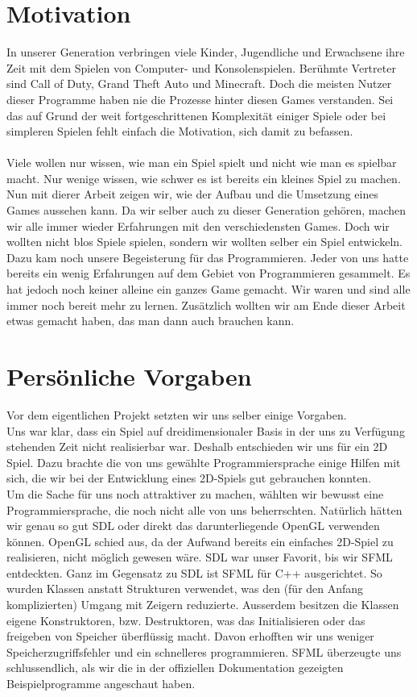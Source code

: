 \documentclass[11pt,a4paper]{scrbook}
\begin{document}
\section{Motivation}
In unserer Generation verbringen viele Kinder, Jugendliche und Erwachsene
ihre Zeit mit dem Spielen von Computer- und Konsolenspielen.
Berühmte Vertreter sind Call of Duty, Grand Theft Auto und Minecraft.
Doch die meisten Nutzer dieser Programme haben nie die Prozesse hinter diesen Games verstanden.
Sei das auf Grund der weit fortgeschrittenen Komplexität einiger Spiele
oder bei simpleren Spielen fehlt einfach die Motivation, sich damit zu befassen.\\
\\
Viele wollen nur wissen, wie man ein Spiel spielt und nicht wie man es spielbar macht. Nur wenige wissen, wie schwer es ist bereits ein
kleines Spiel zu machen. Nun mit dierer Arbeit zeigen wir, wie der Aufbau und die Umsetzung eines Games aussehen kann.
Da wir selber auch zu dieser Generation gehören, 
machen wir alle immer wieder Erfahrungen mit den verschiedensten Games.
Doch wir wollten nicht blos Spiele spielen, 
sondern wir wollten selber ein Spiel entwickeln.
Dazu kam noch unsere Begeisterung für das Programmieren.
Jeder von uns hatte bereits ein wenig Erfahrungen auf dem Gebiet von Programmieren gesammelt. Es hat jedoch noch keiner alleine
ein ganzes Game gemacht. Wir waren und sind alle immer noch bereit mehr zu lernen.
Zusätzlich wollten wir am Ende dieser Arbeit etwas gemacht haben, das man dann auch brauchen kann.

\section{Persönliche Vorgaben}

Vor dem eigentlichen Projekt setzten wir uns selber einige Vorgaben.
\\
Uns war klar, dass ein Spiel auf dreidimensionaler Basis in der uns zu Verfügung stehenden Zeit nicht realisierbar war. Deshalb entschieden wir uns für ein 2D Spiel.
Dazu brachte die von uns gewählte Programmiersprache einige Hilfen mit sich, die wir bei der Entwicklung eines 2D-Spiels gut gebrauchen konnten.
\\
Um die Sache für uns noch attraktiver zu machen,
wählten wir bewusst eine Programmiersprache, die noch nicht
alle von uns beherrschten. Natürlich hätten wir genau so gut
SDL oder direkt das darunterliegende OpenGL verwenden können. OpenGL
schied aus, da der Aufwand bereits ein einfaches 2D-Spiel zu realisieren, nicht möglich gewesen wäre. SDL war unser Favorit, bis wir
SFML entdeckten. Ganz im Gegensatz zu SDL ist SFML für C++ ausgerichtet. So wurden Klassen anstatt Strukturen verwendet, was den (für den
Anfang komplizierten) Umgang mit Zeigern reduzierte. Ausserdem besitzen die
Klassen eigene Konstruktoren, bzw. Destruktoren, was das Initialisieren
oder das freigeben von Speicher überflüssig macht. Davon erhofften wir uns
weniger Speicherzugriffsfehler und ein schnelleres programmieren. SFML
überzeugte uns schlussendlich, als wir die in der offiziellen Dokumentation
gezeigten Beispielprogramme angeschaut haben. 
\end{document}
